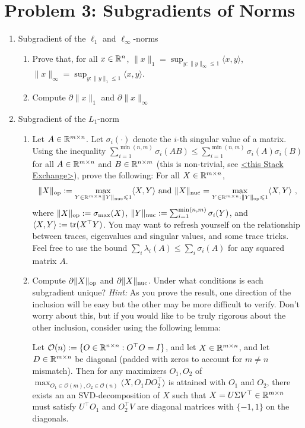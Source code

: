 \documentclass[12pt]{article}
\begin{document}
\section*{Problem 3: Subgradients of Norms}
\begin{enumerate}
\item Subgradient of the $\ell_1$ and $\ell_{\infty}$-norms
\begin{enumerate}
\item
Prove that, for all $x \in \mathbb{R}^n$, $\|x\|_1 = \sup_{y: \|y\|_{\infty} \le 1}\langle x, y \rangle$, $\|x\|_{\infty} = \sup_{y:\|y\|_1 \le 1}\langle x, y \rangle$. 
\item
Compute $\partial \|x\|_1$ and $\partial \|x\|_{\infty}$
\end{enumerate}
\item 
Subgradient of the $L_1$-norm
\begin{enumerate}
\item
Let $A \in \mathbb{R}^{m \times n}$. Let $\sigma_i(\cdot)$ denote the $i$-th singular value of a matrix. Using the inequality $\sum_{i=1}^{\min(n,m)}\sigma_i(AB) \le \sum_{i=1}^{\min(n,m)} \sigma_i(A)\sigma_i(B)$ for all $A \in \mathbb{R}^{m \times n}$ and $B \in \mathbb{R}^{n \times m}$ (this is non-trivial, see \href{<https://math.stackexchange.com/questions/1648542/proving-holders-inequality-for-schatten-norms>}{<this Stack Exchange>}), prove the following: For all $X \in \mathbb{R}^{m \times n}$, 
\begin{eqnarray}
\|X\|_{\mathrm{op}} :=  \max_{Y \in \mathbb{R}^{m \times n}  \|Y\|_{\mathrm{nuc}} \leqslant 1} \langle X, Y \rangle  \text{ and } \|X\|_{\mathrm{nuc}} =  \max_{Y \in \mathbb{R}^{m \times n} :\|Y\|_{\mathrm{op}} \leqslant 1} \langle X, Y \rangle ~,
\end{eqnarray}
where $\|X\|_{\mathrm{op}} := \sigma_{\max}(X)$, $ \|Y\|_{\mathrm{nuc}} := \sum_{i=1}^{\min(n,m)} \sigma_i(Y)$, and $\langle X, Y \rangle := \mathrm{tr}(X^\top Y)$. You may want to refresh yourself on the relationship between traces, eigenvalues and singular values, and some trace tricks. Feel free to use the bound $\sum_{i} \lambda_i (A) \le \sum_i \sigma_i(A)$ for any squared matrix $A$. 
\item
Compute $\partial \|X\|_{\mathrm{op}}$ and $\partial \|X\|_{\mathrm{nuc}}$. Under what conditions is each subgradient unique?
\emph{Hint: }As you prove the result, one direction of the inclusion will be easy but the other may be more difficult to verify. Don't worry about this, but if you would like to be truly rigorous about the other inclusion, consider using the following lemma:
\begin{lemma*} Let $\mathcal{O}(n):= \{O \in \mathbb{R}^{n \times n}:O^\top O = I\}$, and let $X \in \mathbb{R}^{m \times n}$, and let $D \in \mathbb{R}^{m \times n}$ be diagonal (padded with zeros to account for $m\ne n$ mismatch). Then for any maximizers $O_1,O_2$ of $\max_{O_1 \in \mathcal{O}(m),O_2 \in \mathcal{O}(n)}\langle X, O_1DO_2^\top \rangle$ is attained with $O_1$ and $O_2$, there exists an an SVD-decomposition of $X$ such that $X =  U\Sigma V^\top \in \mathbb{R}^{m \times n}$ must satisfy $U^\top O_1$ and $O_2^\top V$ are diagonal matrices with $\{-1,1\}$ on the diagonals.
\end{lemma*}


\end{enumerate}
\end{enumerate}
\end{document}
